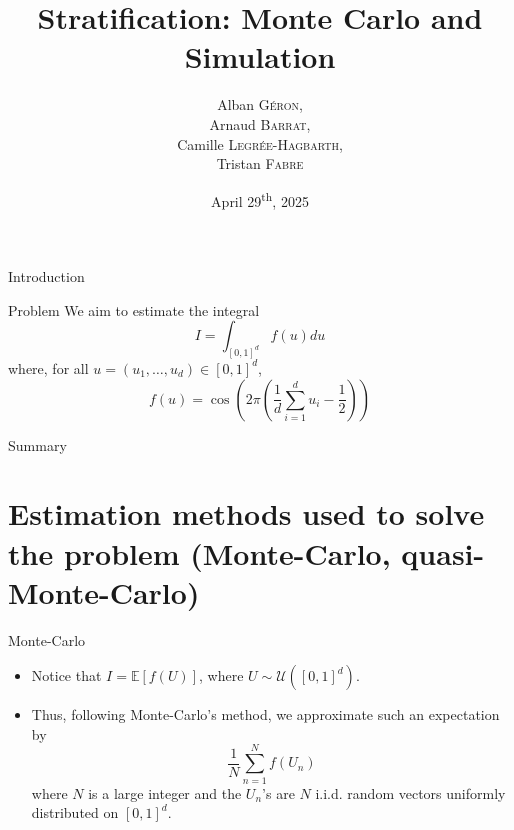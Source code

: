 \documentclass[aspectratio=169,xcolor=dvipsnames]{beamer}
\title{Stratification: Monte Carlo and Simulation}
\author{
    Alban \textsc{Géron}, \\
    Arnaud \textsc{Barrat}, \\
    Camille \textsc{Legrée-Hagbarth}, \\
    Tristan \textsc{Fabre}
}
\date{April 29\textsuperscript{th}, 2025}
\begin{document}
    \begin{frame}
        \titlepage
    \end{frame}

    \begin{frame}{Introduction}
    \end{frame}

    \begin{frame}{Problem}
        We aim to estimate the integral
        \[I = \int_{[0, 1]^d} f(u) du\]
        where, for all $u = (u_1, \dots, u_d) \in [0, 1]^d$,
        \[f(u) = \cos\left(2 \pi \left(\frac{1}{d} \sum_{i = 1}^d u_i - \frac{1}{2}\right)\right)\]
    \end{frame}

    \begin{frame}{Summary}
        \tableofcontents
    \end{frame}

    \section{Estimation methods used to solve the problem (Monte-Carlo, quasi-Monte-Carlo)}

    \begin{frame}{Monte-Carlo}
        \begin{itemize}
            \item<1-> Notice that $I = \mathbb{E}[f(U)]$, where $U \sim \mathcal{U}([0, 1]^d)$.

            \item<2-> Thus, following Monte-Carlo's method, we approximate such an expectation by
            \[\frac{1}{N} \sum_{n = 1}^N f(U_n)\]
            where $N$ is a large integer and the $U_n$'s are $N$ i.i.d. random vectors uniformly distributed on $[0, 1]^d$.
        \end{itemize}
    \end{frame}
\end{document}

